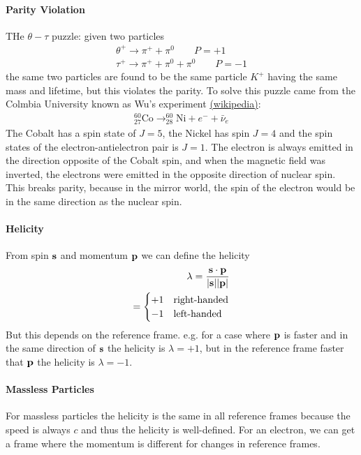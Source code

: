 \documentclass[../main.tex]{subfiles}
\begin{document}
\paragraph*{Parity Violation} THe $\theta-\tau$ puzzle: given two particles
\begin{align*}
    \theta^+ \to \pi^+ + \pi^0 \qquad P = +1 \\
    \tau^+ \to \pi^+ + \pi^0 + \pi^0 \qquad P = -1
\end{align*}
the same two particles are found to be the same particle $K^+$ having the same mass and lifetime, 
but this violates the parity. To solve this puzzle came from the Colmbia University known as 
Wu's experiment \href{https://en.wikipedia.org/wiki/Wu_experiment}{(wikipedia)}:
\begin{align*}
    _{27}^{60} \text{Co} \to _{28}^{60} \text{Ni} + e^- + \bar \nu_e
\end{align*}
The Cobalt has a spin state of $J = 5$, the Nickel has spin $J = 4$ and the spin states of the 
electron-antielectron pair is $J = 1$. The electron is always emitted in the direction opposite of
the Cobalt spin, and when the magnetic field was inverted, the electrons were emitted in the
opposite direction of nuclear spin. This breaks parity, because in the mirror world, the spin of the
electron would be in the same direction as the nuclear spin.

\paragraph*{Helicity} From spin $\vb s$ and momentum $\vb p$ we can define the helicity
\begin{align*}
    \lambda = \frac{\vb{s} \cdot \vb{p}}{\abs{\vb{s}} \abs{\vb p}} \\
    =\begin{cases}
        +1 & \text{right-handed} \\
        -1 & \text{left-handed}
    \end{cases}
\end{align*}
But this depends on the reference frame. e.g. for a case where $\vb p$ is faster and in the same
direction of $\vb s$ the helicity is $\lambda = +1$, but in the reference frame faster that $\vb p$
the helicity is $\lambda = -1$.

\paragraph*{Massless Particles} For massless particles the helicity is the same in all reference
frames because the speed is always $c$ and thus the helicity is well-defined. For an electron, we
can get a frame where the momentum is different for changes in reference frames.
\end{document}
